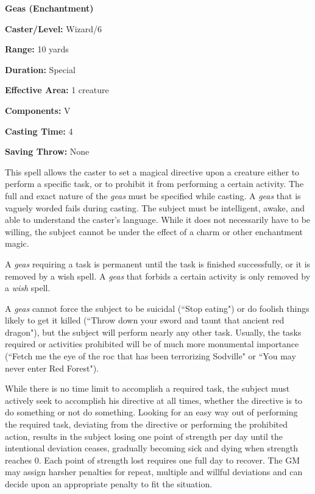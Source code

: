 \begin{multicols}{2}
\vspace{1em}

\noindent
\begin{minipage}{\columnwidth}

\noindent \textbf{Geas (Enchantment)}

\noindent \textbf{Caster/Level:} Wizard/6

\noindent \textbf{Range:} 10 yards

\noindent \textbf{Duration:} Special

\noindent \textbf{Effective Area:} 1 creature

\noindent \textbf{Components:} V

\noindent \textbf{Casting Time:} 4

\noindent \textbf{Saving Throw:} None

\end{minipage}

This spell allows the caster to set a magical directive upon a creature either to perform a specific task, or to prohibit it from performing a certain activity.  The full and exact nature of the \textit{geas} must be specified while casting.  A \textit{geas} that is vaguely worded fails during casting.  The subject must be intelligent, awake, and able to understand the caster's language.  While it does not necessarily have to be willing, the subject cannot be under the effect of a charm or other enchantment magic.  

A \textit{geas} requiring a task is permanent until the task is finished successfully, or it is removed by a wish spell.  A \textit{geas} that forbids a certain activity is only removed by a \textit{wish} spell.

A \textit{geas} cannot force the subject to be suicidal (``Stop eating") or do foolish things likely to get it killed (``Throw down your sword and taunt that ancient red dragon"), but the subject will perform nearly any other task.  Usually, the tasks required or activities prohibited will be of much more monumental importance (``Fetch me the eye of the roc that has been terrorizing Sodville" or ``You may never enter Red Forest").

While there is no time limit to accomplish a required task, the subject must actively seek to accomplish his directive at all times, whether the directive is to do something or not do something.  Looking for an easy way out of performing the required task, deviating from the directive or performing the prohibited action, results in the subject losing one point of strength per day until the intentional deviation ceases, gradually becoming sick and dying when strength reaches 0.  Each point of strength lost requires one full day to recover.  The GM may assign harsher penalties for repeat, multiple and willful deviations and can decide upon an appropriate penalty to fit the situation.


\end{multicols}
